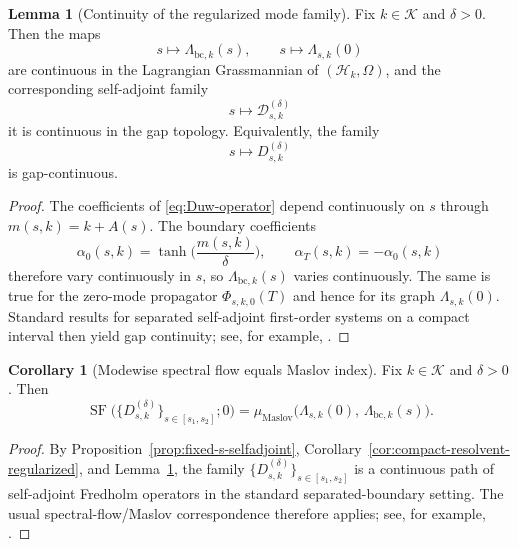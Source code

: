 \documentclass[11pt]{article}
\theoremstyle{definition}
\newtheorem{lemma}[theorem]{Lemma}
\newtheorem{corollary}[theorem]{Corollary}
\numberwithin{equation}{section}
\begin{document}
\begin{lemma}[Continuity of the regularized mode family]
\label{lem:gap-continuity-regularized}
Fix \(k\in\mathcal K\) and \(\delta>0\). Then the maps
\begin{equation}
s\longmapsto \Lambda_{\mathrm{bc},k}(s),
\qquad
s\longmapsto \Lambda_{s,k}(0)
\end{equation}
are continuous in the Lagrangian Grassmannian of \((\mathcal H_k,\Omega)\), and the corresponding self-adjoint family
\begin{equation}
s\longmapsto \mathcal D^{(\delta)}_{s,k}
\end{equation}
it is continuous in the gap topology. Equivalently, the family
\begin{equation}
s\longmapsto D^{(\delta)}_{s,k}
\end{equation}
is gap-continuous.
\end{lemma}

\begin{proof}
The coefficients of \eqref{eq:Duw-operator} depend continuously on \(s\) through \(m(s,k)=k+A(s)\). The boundary coefficients
\begin{equation}
\alpha_0(s,k)=\tanh\!\Big(\frac{m(s,k)}{\delta}\Big),
\qquad
\alpha_T(s,k)=-\alpha_0(s,k)
\end{equation}
therefore vary continuously in \(s\), so \(\Lambda_{\mathrm{bc},k}(s)\) varies continuously. The same is true for the zero-mode propagator \(\Phi_{s,k,0}(T)\) and hence for its graph \(\Lambda_{s,k}(0)\). Standard results for separated self-adjoint first-order systems on a compact interval then yield gap continuity; see, for example, \cite{Nicolaescu1995,BaerBallmann2012}.
\end{proof}

\begin{corollary}[Modewise spectral flow equals Maslov index]
\label{cor:sf-equals-maslov}
Fix \(k\in\mathcal K\) and \(\delta>0\). Then
\begin{equation}
\operatorname{SF}\bigl(\{D^{(\delta)}_{s,k}\}_{s\in[s_1,s_2]};0\bigr)
=
\mu_{\mathrm{Maslov}}\!\bigl(\Lambda_{s,k}(0),\,\Lambda_{\mathrm{bc},k}(s)\bigr).
\end{equation}
\end{corollary}

\begin{proof}
By Proposition~\ref{prop:fixed-s-selfadjoint}, Corollary~\ref{cor:compact-resolvent-regularized}, and Lemma~\ref{lem:gap-continuity-regularized}, the family \(\{D^{(\delta)}_{s,k}\}_{s\in[s_1,s_2]}\) is a continuous path of self-adjoint Fredholm operators in the standard separated-boundary setting. The usual spectral-flow/Maslov correspondence therefore applies; see, for example, \cite[Theorem~3.14]{Nicolaescu1995}.
\end{proof}
\end{document}
